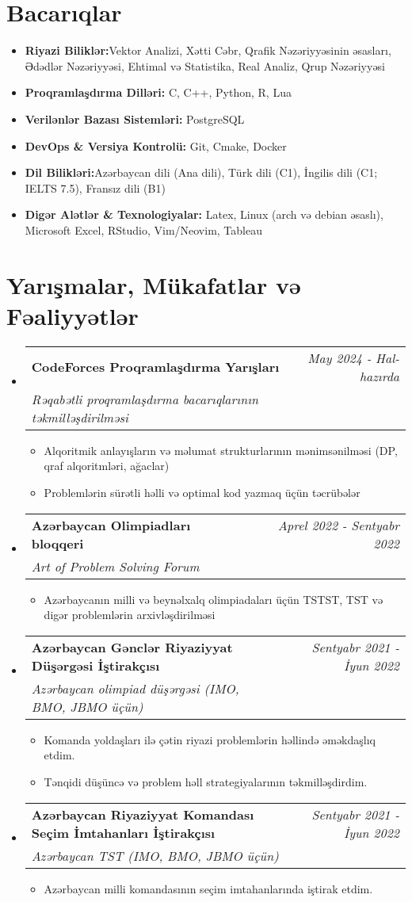 \documentclass[a4paper,11pt]{article}
\makeatletter
\newcommand{\resumeItem}[2]{
\item{
        \textbf{#1}{\hspace{0.5mm}#2 \vspace{-0.5mm}}
    }
}
\newcommand{\resumeProject}[4]{
    \vspace{0.5mm}
\item
    \begin{tabular*}{0.98\textwidth}[t]{l@{\extracolsep{\fill}}r}
        \textbf{#1} & \textit{\footnotesize{#3}} \\
        \footnotesize{\textit{#2}} & \footnotesize{#4}
    \end{tabular*}
    \vspace{-2.4mm}
}
\newcommand{\resumeSubItem}[2]{\resumeItem{#1}{#2}\vspace{-4pt}}
\newcommand{\resumeSubHeadingListStart}{
\begin{itemize}[leftmargin=*,labelsep=1mm]}
\newcommand{\resumeHeadingSkillStart}{
        \begin{itemize}[leftmargin=*,itemsep=1.7mm, rightmargin=2ex]}
\newcommand{\resumeItemListStart}{
                \begin{itemize}[leftmargin=*,labelsep=1mm,itemsep=0.5mm]}
\newcommand{\resumeSubHeadingListEnd}{
                    \end{itemize}\vspace{2mm}}
\newcommand{\resumeHeadingSkillEnd}{
            \end{itemize}\vspace{-2mm}}
\newcommand{\resumeItemListEnd}{
    \end{itemize}\vspace{-2mm}}
\makeatother
\begin{document}
\section{\textbf{Bacarıqlar}}
\resumeHeadingSkillStart
\resumeSubItem{Riyazi Biliklər:}
{Vektor Analizi, Xətti Cəbr, Qrafik Nəzəriyyəsinin əsasları, Ədədlər Nəzəriyyəsi, Ehtimal və Statistika, Real Analiz, Qrup Nəzəriyyəsi}
\resumeSubItem{Proqramlaşdırma Dilləri:}
{ C, C++, Python, R, Lua}
\resumeSubItem{Verilənlər Bazası Sistemləri:}
{ PostgreSQL}
\resumeSubItem{DevOps \& Versiya Kontrolü:}
{ Git, Cmake, Docker }
\resumeSubItem{Dil Bilikləri:}
{Azərbaycan dili (Ana dili), Türk dili (C1), İngilis dili (C1; IELTS 7.5), Fransız dili (B1)}
\resumeSubItem{Digər Alətlər \& Texnologiyalar:}
{ Latex, Linux (arch və debian əsaslı), Microsoft Excel, RStudio, Vim/Neovim, Tableau}
\resumeHeadingSkillEnd

\section{\textbf{Yarışmalar, Mükafatlar və Fəaliyyətlər}}
\resumeSubHeadingListStart
\resumeProject
{CodeForces Proqramlaşdırma Yarışları}
{Rəqabətli proqramlaşdırma bacarıqlarının təkmilləşdirilməsi}
{May 2024 - Hal-hazırda}
{{}\href{https://codeforces.com/profile/JosephMehdiyev}{\textcolor{darkblue}{\faIcon{globe}}}}
\resumeItemListStart
\item Alqoritmik anlayışların və məlumat strukturlarının mənimsənilməsi (DP, qraf alqoritmləri, ağaclar)
\item Problemlərin sürətli həlli və optimal kod yazmaq üçün təcrübələr
\resumeItemListEnd

\resumeProject
{Azərbaycan Olimpiadları bloqqeri}
{Art of Problem Solving Forum}
{Aprel 2022 - Sentyabr 2022}
{{}\href{https://artofproblemsolving.com/community/user/948405}{\textcolor{darkblue}{\faIcon{globe}}}}
\resumeItemListStart
\item Azərbaycanın milli və beynəlxalq olimpiadaları üçün TSTST, TST və digər problemlərin arxivləşdirilməsi
\resumeItemListEnd

\resumeProject
{Azərbaycan Gənclər Riyaziyyat Düşərgəsi İştirakçısı}
{Azərbaycan olimpiad düşərgəsi (IMO, BMO, JBMO üçün)}
{Sentyabr 2021 - İyun 2022}
{}
\resumeItemListStart
\item Komanda yoldaşları ilə çətin riyazi problemlərin həllində əməkdaşlıq etdim.
\item Tənqidi düşüncə və problem həll strategiyalarının təkmilləşdirdim.
\resumeItemListEnd

\resumeProject
{Azərbaycan Riyaziyyat Komandası Seçim İmtahanları İştirakçısı}
{Azərbaycan TST (IMO, BMO, JBMO üçün)}
{Sentyabr 2021 - İyun 2022}
{}
\resumeItemListStart
\item Azərbaycan milli komandasının seçim imtahanlarında iştirak etdim.
\resumeItemListEnd
\resumeSubHeadingListEnd

\end{document}
